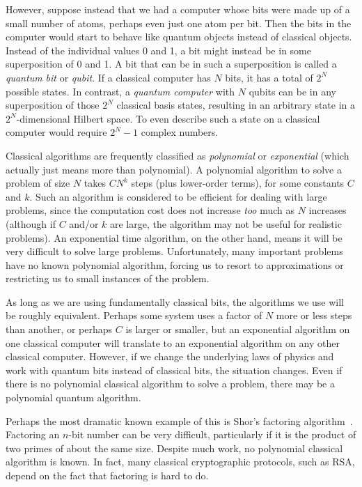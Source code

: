 However, suppose instead that we had a computer whose bits were made
up of a small number of atoms, perhaps even just one atom per bit.
Then the bits in the computer would start to behave like quantum
objects instead of classical objects.  Instead of the individual
values 0 and 1, a bit might instead be in some superposition of 0 and
1.  A bit that can be in such a superposition is called a {\em quantum
bit} or {\em qubit}.  If a classical computer has $N$ bits, it has a 
total of $2^N$ possible states.  In contrast, a {\em quantum
computer} with $N$ qubits can be in any superposition of those $2^N$
classical basis states, resulting in an arbitrary state in a
$2^N$-dimensional Hilbert space.  To even describe such a state on a
classical computer would require $2^N - 1$ complex numbers.

Classical algorithms are frequently classified as {\em polynomial} or
{\em exponential} (which actually just means more than polynomial).  A
polynomial algorithm to solve a problem of size $N$ takes $C N^k$
steps (plus lower-order terms), for some constants $C$ and $k$.  Such
an algorithm is considered to be efficient for dealing with large
problems, since the computation cost does not increase {\em too} much
as $N$ increases (although if $C$ and/or $k$ are large, the algorithm
may not be useful for realistic problems).  An exponential time
algorithm, on the other hand, means it will be very difficult to solve
large problems.  Unfortunately, many important problems have no known
polynomial algorithm, forcing us to resort to approximations or
restricting us to small instances of the problem.

As long as we are using fundamentally classical bits, the algorithms
we use will be roughly equivalent.  Perhaps some system uses a factor
of $N$ more or less steps than another, or perhaps $C$ is larger or
smaller, but an exponential algorithm on one classical computer will
translate to an exponential algorithm on any other classical
computer.  However, if we change the underlying laws of physics and
work with quantum bits instead of classical bits, the situation
changes.  Even if there is no polynomial classical algorithm to solve
a problem, there may be a polynomial quantum algorithm.

Perhaps the most dramatic known example of this is Shor's factoring
algorithm~\cite{factor}.  Factoring an $n$-bit number can be very
difficult, particularly if it is the product of two primes of about
the same size.  Despite much work, no polynomial classical algorithm
is known.  In fact, many classical cryptographic protocols, such as
RSA, depend on the fact that factoring is hard to do.

